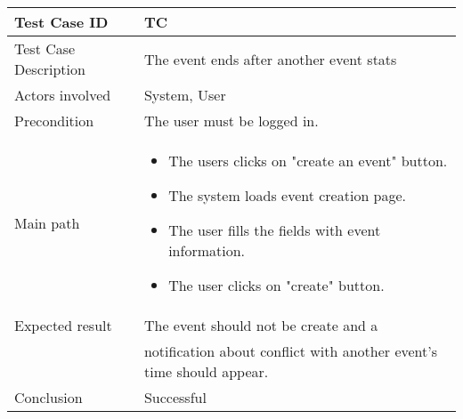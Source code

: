 \begin{center} \begin{tabular}{|l|l|}
  \hline
  Test Case ID & TC \z\\
  \hline
  Test Case Description & The event ends after another event stats\\
  \hline
  Actors involved & System, User\\
   \hline
  Precondition & The user must be logged in.\\
  \hline
  Main path &   \begin{minipage}{5in}
    \vskip 4pt
            \begin{itemize}
              \item The users clicks on "create an event" button.
              \item The system loads event creation page.
              \item The user fills the fields with event information.
              \item The user clicks on "create" button.
            \end{itemize}
    \vskip 4pt
  \end{minipage}  \\
  \hline
  Expected result & The event should not be create and a\\
  & notification about conflict with another event's time should appear.\\
  \hline
  Conclusion & Successful\\
  \hline
\end{tabular} \end{center}


